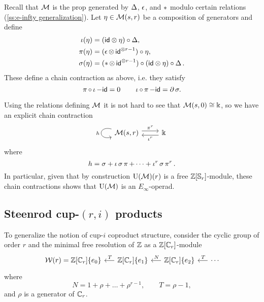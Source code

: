 Recall that $\operatorname{\mathcal{M}}$ is the prop generated by $\operatorname{\Delta}$, $\operatorname{\epsilon}$, and $\operatorname{\ast}$ modulo certain relations (\cref{ss:e-infty generalization}).
Let $\eta \in \operatorname{\mathcal{M}}(s,r)$ be a composition of generators and define
\begin{align*}
	\operatorname{\iota}(\eta) & = (\mathsf{id} \otimes \eta) \circ \operatorname{\Delta}, \\
	\operatorname{\pi}(\eta) & = (\operatorname{\epsilon} \otimes \, \mathsf{id}^{\otimes r-1}) \circ \eta, \\
	\sigma(\eta) & = (\operatorname{\ast} \otimes \, \mathsf{id}^{\otimes r-1}) \circ (\mathsf{id} \otimes \eta) \circ \operatorname{\Delta}.
\end{align*}
These define a chain contraction as above, i.e. they satisfy
\[
\operatorname{\pi} \circ \operatorname{\iota} - \mathsf{id} = 0
\qquad
\operatorname{\iota} \circ \operatorname{\pi} - \mathsf{id} = \operatorname{\partial} \sigma.
\]

Using the relations defining $\operatorname{\mathcal{M}}$ it is not hard to see that $\operatorname{\mathcal{M}}(s,0) \cong \Bbbk$, so we have an explicit chain contraction
\[
\begin{tikzcd}
	\arrow[loop, distance=2em, in=195, out=165, "h"'] \Med(s,r) \arrow[r, shift left=3pt, "\proj^r"] &
	\k \arrow[l, shift left=3pt, "\incl^r"]
\end{tikzcd}
\]
where
\begin{equation} \label{e:big chain contraction}
	h = \sigma + \operatorname{\iota} \sigma \operatorname{\pi} + \dots + \operatorname{\iota}^{r} \sigma \operatorname{\pi}^{r}.
\end{equation}
In particular, given that by construction $\operatorname{\mathrm{U}(\mathcal{M})}(r)$ is a free $\mathbb{Z}[\mathbb{S}_r]$-module, these chain contractions shows that $\operatorname{\mathrm{U}(\mathcal{M})}$ is an $E_\infty$-operad.

\subsection{Steenrod cup-$(r,i)$ products} \label{ss:higher cup-i coproducts}

To generalize the notion of cup-$i$ coproduct structure, consider the cyclic group of order $r$ and the minimal free resolution of $\mathbb{Z}$ as a $\mathbb{Z}[\mathbb{C}_r]$-module
\begin{equation} \label{e:minimal resolution r>2}
	\begin{tikzcd} [column sep = .5cm]
		\mathcal W(r) = \Z[\Cyc_r]\{e_0\} & \arrow[l, "\,T"'] \Z[\Cyc_r]\{e_1\} & \arrow[l, "\,N"'] \Z[\Cyc_r]\{e_2\} & \arrow[l, "\,T"'] \cdots
	\end{tikzcd}
\end{equation}
where
\begin{equation} \label{e:transposition and norm maps}
	N = 1 + \rho + \dots + \rho^{r-1}, \qquad
	T = \rho - 1,
\end{equation}
and $\rho$ is a generator of $\mathbb{C}_r$.

